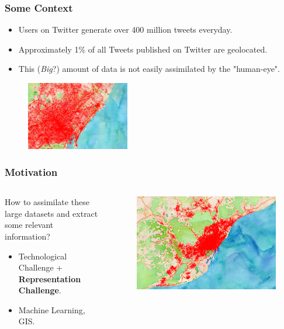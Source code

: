 \documentclass[hyperref={pdfpagelabels=true}]{beamer}
\begin{document}
\begin{frame}
\frametitle{Some Context}
\begin{itemize}    
      \item<1->Users on Twitter generate over 400 million tweets everyday.%
      \item<2->Approximately 1\% of all Tweets published on Twitter are geolocated.
      \item<3->This (\textit{Big}?) amount of data is not easily assimilated by the "human-eye".
\end{itemize}          
  \begin{figure}   
    \includegraphics[width=0.4\textwidth]{bigdata1.png}   
  \end{figure}     
\end{frame}

\begin{frame}
\frametitle{Motivation}
\begin{columns}
  \begin{column}{0.5\textwidth}\small{ 
      How to assimilate these large datasets and extract some relevant information?
      \begin{itemize}    
	    \item<2->Technological Challenge + \textbf{Representation Challenge}.
	    \item<3->Machine Learning, GIS.      
      \end{itemize}                }
  \end{column}
  \begin{column}{0.5\textwidth}      
	\begin{figure}   
	  \includegraphics[width=\textwidth]{bigdata2.png}   
	\end{figure}     
  \end{column}  
\end{columns}
\end{frame}
\end{document}
